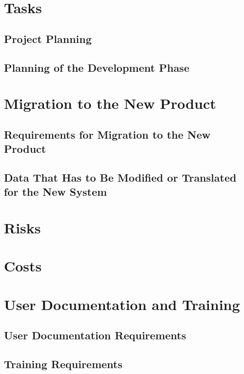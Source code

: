 \documentclass{article}
\begin{document}
\section{Tasks}

\subsection{Project Planning}
 

\subsection{Planning of the Development Phase}


\section{Migration to the New Product}

\subsection{Requirements for Migration to the New Product}


\subsection{Data That Has to Be Modified or Translated for the New System}


\section{Risks}

\section{Costs}

\section{User Documentation and Training}

\subsection{User Documentation Requirements}


\subsection{Training Requirements}
\end{document}
